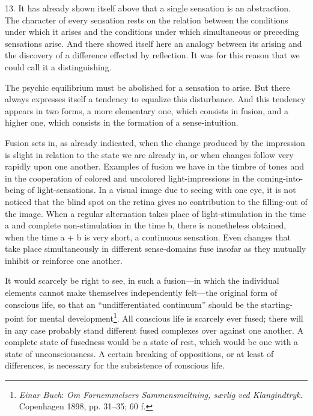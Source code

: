 \documentclass[12pt,a4paper]{book}
\newcommand{\opage}[1]{\marginnote{\footnotesize\textit{[#1]}}}
\begin{document}
13. It has already shown itself above that a single sensation is an
abstraction. The character of every sensation rests on the relation
between the conditions under which it arises and the conditions under
which simultaneous or preceding sensations arise. And there showed itself
here an analogy between its arising and the discovery of a difference
effected by reflection. It was for this reason that we could call it a
distinguishing.

The psychic equilibrium must be abolished for a sensation to arise. But
there always expresses itself a tendency to equalize this disturbance.
And this tendency appears in two forms, a more elementary one, which
consists in \opage{45}fusion, and a higher one, which consists in the formation of
a sense-intuition.

Fusion sets in, as already indicated, when the change produced by the
impression is slight in relation to the state we are already in, or when
changes follow very rapidly upon one another. Examples of fusion we have
in the timbre of tones and in the cooperation of colored and uncolored
light-impressions in the coming-into-being of light-sensations. In a
visual image due to seeing with one eye, it is not noticed that the blind
spot on the retina gives no contribution to the filling-out of the image.
When a regular alternation takes place of light-stimulation in the time a
and complete non-stimulation in the time b, there is nonetheless
obtained, when the time a + b is very short, a continuous sensation. Even
changes that take place simultaneously in different sense-domains fuse
insofar as they mutually inhibit or reinforce one another.

It would scarcely be right to see, in such a fusion---in which the
individual elements cannot make themselves independently felt---the
original form of conscious life, so that an ``undifferentiated
continuum'' should be the starting-point for mental
development\footnote{\emph{Einar Buch}: \emph{Om Fornemmelsers
Sammensmeltning, særlig ved Klangindtryk}. Copenhagen 1898, pp. 31--35;
60 f.}. All conscious life is scarcely ever fused; there will in any case
probably stand different fused complexes over against one another. A
complete state of fusedness would be a state of rest, which would be one
with a state of unconsciousness. A certain breaking of oppositions, or at
least of differences, is necessary for the subsistence of conscious life.
\end{document}

